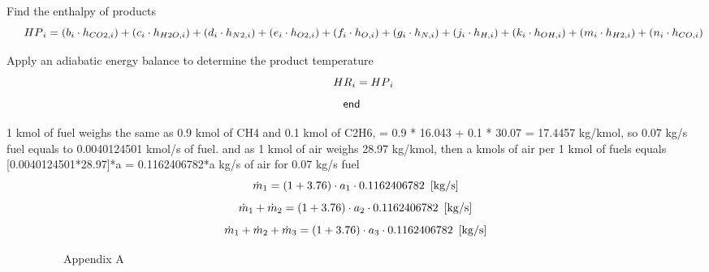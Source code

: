 \documentclass[10pt,fleqn]{article}
\newcommand{\K}[1]{\mbox{\sf#1\ \ \mit}}
\newcommand{\V}[1]{\mbox{$ #1 $}}
\newcommand{\I}{\mbox{\hspace{0.20in}}}
\begin{document}
\vspace{0.04in}
\noindent
\rm Find the enthalpy of products
\begin{equation}
\I \label{EES Eqn:54}
\V{HP} _{i} =  \left( b_{i} \cdot  h_{CO2,i} \right)  +  \left( c_{i} \cdot  h_{H2O,i} \right)  +  \left( d_{i} \cdot  h_{N2,i} \right)  +  \left( e_{i} \cdot  h_{O2,i} \right)  +  \left( f_{i} \cdot  h_{O,i} \right)  +  \left( g_{i} \cdot  h_{N,i} \right)  +  \left( j_{i} \cdot  h_{H,i} \right)  +  \left( k_{i} \cdot  h_{OH,i} \right)  +  \left( m_{i} \cdot  h_{H2,i} \right)  +  \left( n_{i} \cdot  h_{CO,i} \right)  
\end{equation}

\vspace{0.04in}
\noindent
\rm Apply an adiabatic energy balance to determine the product temperature
\begin{equation}
\I \label{EES Eqn:55}
\V{HR} _{i} = \V{HP} _{i} 
\end{equation}
\begin{equation}
\label{EES Eqn:56}
\K{end} 
\end{equation}

\vspace{0.04in}
\noindent
\rm 1 kmol of fuel weighs the same as 0.9 kmol of CH4 and 0.1 kmol of C2H6, = 0.9 * 16.043 + 0.1 * 30.07 = 17.4457 kg/kmol, so 0.07 kg/s fuel equals to 0.0040124501 kmol/s of fuel.\newline
and as 1 kmol of air weighs 28.97 kg/kmol, then a kmols of air per 1 kmol of fuels equals [0.0040124501*28.97]*a = 0.1162406782*a kg/s of air for 0.07 kg/s fuel
\begin{equation}
\label{EES Eqn:57}
\dot {m}_{1} =  \left( 1 + 3.76 \right)  \cdot  a_{1} \cdot  0.1162406782   \   \left[ \rm kg/s \right] 
\end{equation}
\rm
\begin{equation}
\label{EES Eqn:58}
\dot {m}_{1} + \dot {m}_{2} =  \left( 1 + 3.76 \right)  \cdot  a_{2} \cdot  0.1162406782   \   \left[ \rm kg/s \right] 
\end{equation}
\rm
\begin{equation}
\label{EES Eqn:59}
\dot {m}_{1} + \dot {m}_{2} + \dot {m}_{3} =  \left( 1 + 3.76 \right)  \cdot  a_{3} \cdot  0.1162406782   \   \left[ \rm kg/s \right] 
\end{equation}
\rm

\vspace{0.04in}
\noindent
\rm ~~~~~~~~~~Appendix A~~~~~~~~~~
\end{document}

